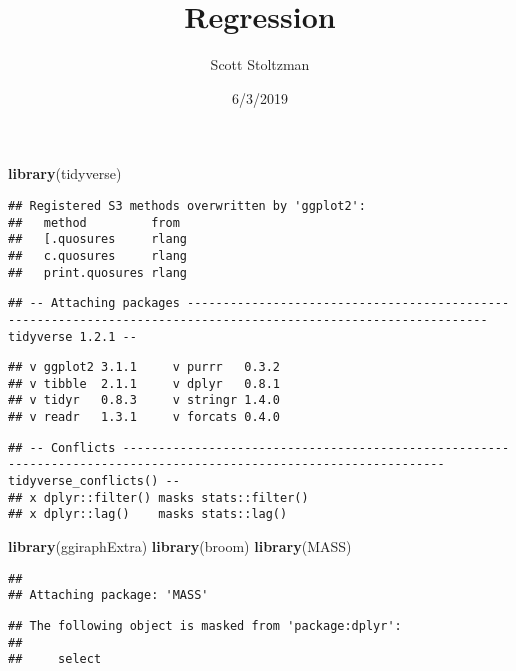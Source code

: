 \documentclass[]{article}
\title{Regression}
\author{Scott Stoltzman}
\date{6/3/2019}
\newenvironment{Shaded}{\begin{snugshade}}{\end{snugshade}}
\newcommand{\KeywordTok}[1]{\textcolor[rgb]{0.13,0.29,0.53}{\textbf{#1}}}
\newcommand{\NormalTok}[1]{#1}
\begin{document}
\maketitle

\begin{Shaded}
\begin{Highlighting}[]
\KeywordTok{library}\NormalTok{(tidyverse)}
\end{Highlighting}
\end{Shaded}

\begin{verbatim}
## Registered S3 methods overwritten by 'ggplot2':
##   method         from 
##   [.quosures     rlang
##   c.quosures     rlang
##   print.quosures rlang
\end{verbatim}

\begin{verbatim}
## -- Attaching packages ---------------------------------------------------------------------------------------------------------------- tidyverse 1.2.1 --
\end{verbatim}

\begin{verbatim}
## v ggplot2 3.1.1     v purrr   0.3.2
## v tibble  2.1.1     v dplyr   0.8.1
## v tidyr   0.8.3     v stringr 1.4.0
## v readr   1.3.1     v forcats 0.4.0
\end{verbatim}

\begin{verbatim}
## -- Conflicts ------------------------------------------------------------------------------------------------------------------- tidyverse_conflicts() --
## x dplyr::filter() masks stats::filter()
## x dplyr::lag()    masks stats::lag()
\end{verbatim}

\begin{Shaded}
\begin{Highlighting}[]
\KeywordTok{library}\NormalTok{(ggiraphExtra)}
\KeywordTok{library}\NormalTok{(broom)}
\KeywordTok{library}\NormalTok{(MASS)}
\end{Highlighting}
\end{Shaded}

\begin{verbatim}
## 
## Attaching package: 'MASS'
\end{verbatim}

\begin{verbatim}
## The following object is masked from 'package:dplyr':
## 
##     select
\end{verbatim}
\end{document}
